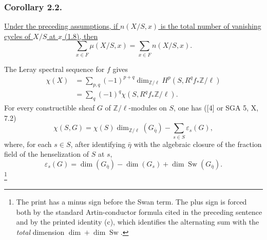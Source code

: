 \subsubsection*{Corollary 2.2.}
\underline{Under the preceding assumptions, if $n(X/S,x)$ is the
total number of vanishing cycles of $X/S$ at $x$ (1.8), then}
\[
\sum_{x\in F}\mu(X/S,x)=\sum_{x\in F}n(X/S,x).
\]

The Leray spectral sequence for $f$ gives
\begin{align*}
\chi(X)
&=\sum_{p,q}(-1)^{p+q}
\dim_{\mathbb Z/\ell}H^p(S,R^qf_*\mathbb Z/\ell)\\
&=\sum_q(-1)^q\chi(S,R^qf_*\mathbb Z/\ell).
\end{align*}
For every constructible sheaf $G$ of $\mathbb Z/\ell$-modules on
$S$, one has ([4] or SGA 5, X, 7.2)
\[
\chi(S,G)=\chi(S)\dim_{\mathbb Z/\ell}(G_{\bar\eta})
-\sum_{s\in S}\varepsilon_s(G),
\]
where, for each $s\in S$, after identifying $\bar\eta$ with the
algebraic closure of the fraction field of the henselization of $S$
at $s$,
\[
\varepsilon_s(G)=
\dim(G_{\bar\eta})-\dim(G_s)+\dim\operatorname{Sw}(G_{\bar\eta}).
\]
\footnote{The print has a minus sign before the Swan term.  The plus
sign is forced both by the standard Artin-conductor formula cited in
the preceding sentence and by the printed identity (c), which
identifies the alternating sum with the \emph{total} dimension
$\dim+\dim\operatorname{Sw}$.}

